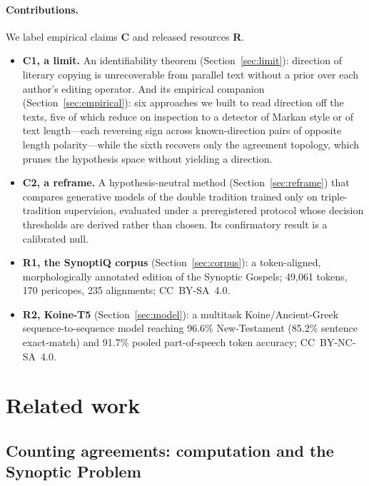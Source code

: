 \documentclass[11pt,letterpaper]{article}
\begin{document}
\paragraph{Contributions.} We label empirical claims \textbf{C} and released resources \textbf{R}.
\begin{itemize}
\item \textbf{C1, a limit.} An identifiability theorem (Section~\ref{sec:limit}): direction of literary copying is unrecoverable from parallel text without a prior over each author's editing operator. And its empirical companion (Section~\ref{sec:empirical}): six approaches we built to read direction off the texts, five of which reduce on inspection to a detector of Markan style or of text length---each reversing sign across known-direction pairs of opposite length polarity---while the sixth recovers only the agreement topology, which prunes the hypothesis space without yielding a direction.
\item \textbf{C2, a reframe.} A hypothesis-neutral method (Section~\ref{sec:reframe}) that compares generative models of the double tradition trained only on triple-tradition supervision, evaluated under a preregistered protocol whose decision thresholds are derived rather than chosen. Its confirmatory result is a calibrated null.
\item \textbf{R1, the SynoptiQ corpus} (Section~\ref{sec:corpus}): a token-aligned, morphologically annotated edition of the Synoptic Gospels; 49{,}061 tokens, 170 pericopes, 235 alignments; CC~BY-SA~4.0.
\item \textbf{R2, Koine-T5} (Section~\ref{sec:model}): a multitask Koine/Ancient-Greek sequence-to-sequence model reaching 96.6\% New-Testament (85.2\% sentence exact-match) and 91.7\% pooled part-of-speech token accuracy; CC~BY-NC-SA~4.0.
\end{itemize}

\section{Related work}
\label{sec:related}

\subsection{Counting agreements: computation and the Synoptic Problem}
\end{document}

